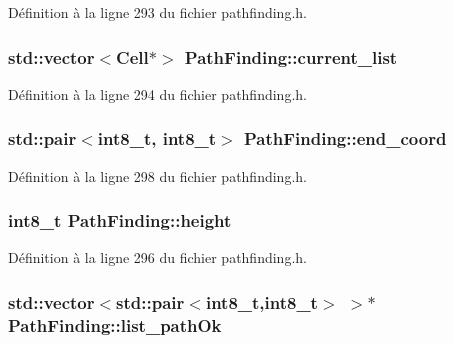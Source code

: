 Définition à la ligne 293 du fichier pathfinding.\-h.

\hypertarget{class_path_finding_a78443d74b8dfff09953f63f40a1768c8}{
\subsubsection[{current\-\_\-list}]{\setlength{\rightskip}{0pt plus 5cm}std\-::vector$<${\bf Cell}$\ast$$>$ Path\-Finding\-::current\-\_\-list\hspace{0.3cm}{\ttfamily [private]}}}\label{class_path_finding_a78443d74b8dfff09953f63f40a1768c8}


Définition à la ligne 294 du fichier pathfinding.\-h.

\hypertarget{class_path_finding_a7db7c62b00778fb60be8fdb10c471851}{
\subsubsection[{end\-\_\-coord}]{\setlength{\rightskip}{0pt plus 5cm}std\-::pair$<$int8\-\_\-t, int8\-\_\-t$>$ Path\-Finding\-::end\-\_\-coord\hspace{0.3cm}{\ttfamily [private]}}}\label{class_path_finding_a7db7c62b00778fb60be8fdb10c471851}


Définition à la ligne 298 du fichier pathfinding.\-h.

\hypertarget{class_path_finding_a61e5643d7459d24b07306a6886348ca1}{
\subsubsection[{height}]{\setlength{\rightskip}{0pt plus 5cm}int8\-\_\-t Path\-Finding\-::height\hspace{0.3cm}{\ttfamily [private]}}}\label{class_path_finding_a61e5643d7459d24b07306a6886348ca1}


Définition à la ligne 296 du fichier pathfinding.\-h.

\hypertarget{class_path_finding_a489cfbcdff32e661c7783caec686321a}{
\subsubsection[{list\-\_\-path\-Ok}]{\setlength{\rightskip}{0pt plus 5cm}std\-::vector$<$std\-::pair$<$int8\-\_\-t,int8\-\_\-t$>$ $>$$\ast$ Path\-Finding\-::list\-\_\-path\-Ok\hspace{0.3cm}{\ttfamily [private]}}}\label{class_path_finding_a489cfbcdff32e661c7783caec686321a}


